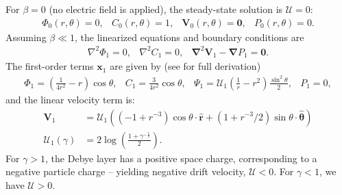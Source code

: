 \documentclass[MSc,beforeExam]{iitcsthesis}
\newcommand{\pars}[1]{\left(#1\right)}
\newcommand\Laplacian{\nabla^2}
\newcommand\bnabla{\boldsymbol{\nabla}}
\newcommand\bLaplacian{\boldsymbol{\nabla}^2}
\newcommand\bV{\boldsymbol{V}}
\newcommand\bx{\boldsymbol{x}}
\newcommand\br{\boldsymbol{r}}
\newcommand\brhat{\hat{\br}}
\newcommand\btheta{\boldsymbol{\theta}}
\newcommand\bthetahat{\hat{\btheta}}
\newcommand\bzero{\boldsymbol{0}}
\newcommand\cU{\mathscr{U}}
\begin{document}
For $\beta = 0$ (no electric field is applied), the steady-state solution is $\cU = 0$:
\begin{equation}\begin{array}{cccc}
\varPhi_0(r,\theta) = 0, &
C_0(r,\theta) = 1, &
\bV_0(r,\theta) = \bzero, &
P_0(r,\theta) = 0.
\end{array}\end{equation}
Assuming $\beta \ll 1$, the linearized equations and boundary conditions are
\begin{equation} \begin{array}{ccc}
\Laplacian \varPhi_1 = 0, &
\Laplacian C_1 = 0, &
\bLaplacian \bV_1 - \bnabla P_1 = \bzero.
\end{array}\end{equation}
The first-order terms $\bx_1$ are given by (see \cite{yariv2010migration} for full derivation)
\begin{equation} \begin{array}{cccc}
\varPhi_1 = \pars{\frac{1}{4r^2} - r}\cos\theta, &
C_1 = \frac{3}{4r^2} \cos\theta, &
\Psi_1 = \cU_1 \pars{\frac{1}{r} - r^2} \frac{\sin^2\theta}{2}, &
P_1 = 0,
\end{array} \end{equation}
and the linear velocity term is:
\begin{align} \label{eq:linear_velocity}
\bV_1 &= \cU_1 \pars{ \pars{-1 + r^{-3}}\cos\theta \cdot \brhat 
+ \pars{1 + r^{-3} / 2} \sin\theta \cdot \bthetahat } \\
\cU_1(\gamma) &= 2 \log \pars{\frac{1 + \gamma^{-\frac{1}{2}}}{2}}.
\end{align}
For $\gamma > 1$, the Debye layer has a positive space charge, 
corresponding to a negative particle charge -- 
yielding negative drift velocity, $\cU < 0$. 
For $\gamma < 1$, we have $\cU > 0$.

\end{document}
